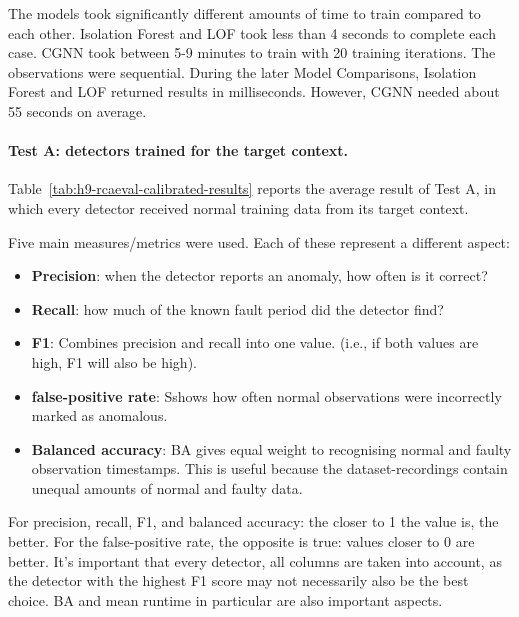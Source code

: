 The models took significantly different amounts of time to train compared to each other. Isolation Forest and LOF took less than 4 seconds to complete each case. CGNN took between 5-9 minutes to train with 20 training iterations. The observations were sequential. During the later Model Comparisons, Isolation Forest and LOF returned results in milliseconds. However, CGNN needed about 55 seconds on average.

\paragraph{Test A: detectors trained for the target context.}
Table~\ref{tab:h9-rcaeval-calibrated-results} reports the average result of Test A, in which every detector received normal training data from its target context.

Five main measures/metrics were used. Each of these represent a different aspect:
\begin{itemize}
    \item \textbf{Precision}: when the detector reports an anomaly, how often is it correct?
    \item \textbf{Recall}: how much of the known fault period did the detector find?
    \item \textbf{F1}: Combines precision and recall into one value. (i.e., if both values are high, F1 will also be high).
    \item \textbf{false-positive rate}: Sshows how often normal observations were incorrectly marked as anomalous.
    \item \textbf{Balanced accuracy}: BA gives equal weight to recognising normal and faulty observation timestamps. This is useful because the dataset-recordings contain unequal amounts of normal and faulty data.
\end{itemize}

For precision, recall, F1, and balanced accuracy: the closer to 1 the value is, the better. For the false-positive rate, the opposite is true: values closer to 0 are better. It's important that every detector, all columns are taken into account, as the detector with the highest F1 score may not necessarily also be the best choice. BA and mean runtime in particular are also important aspects.

\begin{table}[H]
    \centering
    \scriptsize
    \caption{Mean results for the five held-out temporal tests.}
    \label{tab:h9-rcaeval-calibrated-results}
\end{table}

